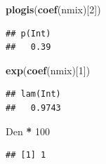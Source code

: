 \documentclass[12pt,]{book}
\newenvironment{Shaded}{\begin{snugshade}}{\end{snugshade}}
\newcommand{\DecValTok}[1]{\textcolor[rgb]{0.00,0.00,0.81}{#1}}
\newcommand{\KeywordTok}[1]{\textcolor[rgb]{0.13,0.29,0.53}{\textbf{#1}}}
\newcommand{\NormalTok}[1]{#1}
\newcommand{\OperatorTok}[1]{\textcolor[rgb]{0.81,0.36,0.00}{\textbf{#1}}}
\newcommand{\StringTok}[1]{\textcolor[rgb]{0.31,0.60,0.02}{#1}}
\begin{document}
\begin{Shaded}
\begin{Highlighting}[]
\KeywordTok{plogis}\NormalTok{(}\KeywordTok{coef}\NormalTok{(nmix)[}\DecValTok{2}\NormalTok{])}
\end{Highlighting}
\end{Shaded}

\begin{verbatim}
## p(Int) 
##   0.39
\end{verbatim}

\begin{Shaded}
\begin{Highlighting}[]
\KeywordTok{exp}\NormalTok{(}\KeywordTok{coef}\NormalTok{(nmix)[}\DecValTok{1}\NormalTok{])}
\end{Highlighting}
\end{Shaded}

\begin{verbatim}
## lam(Int) 
##   0.9743
\end{verbatim}

\begin{Shaded}
\begin{Highlighting}[]
\NormalTok{Den }\OperatorTok{*}\StringTok{ }\DecValTok{100}
\end{Highlighting}
\end{Shaded}

\begin{verbatim}
## [1] 1
\end{verbatim}


\end{document}
